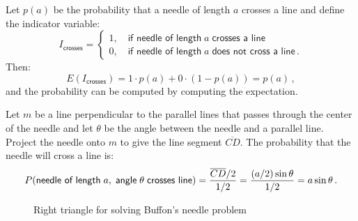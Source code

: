 
Let $p(a)$ be the probability that a needle of length $a$ crosses a line and define the indicator variable:
\[
I_{\textsf{crosses}}=
\left\{
\begin{array}{ll}
1,\quad \textsf{if needle of length}\;a\;\textsf{crosses a line}\\
0, \quad \textsf{if needle of length}\;a\;\textsf{does not cross a line}\,.
\end{array}
\right.
\]
Then:
\begin{equation}\label{eq.buffon-probability}
E(I_{\textsf{crosses}})=1\cdot p(a) + 0\cdot (1-p(a))=p(a)\,,
\end{equation}
and the probability can be computed by computing the expectation.

Let $m$ be a line perpendicular to the parallel lines that passes through the center of the needle and let $\theta$ be the angle between the needle and a parallel line. Project the needle onto $m$ to give the line segment $\overline{CD}$. The probability that the needle will cross a line is:
\begin{equation}\label{eq.cross}
P(\textsf{needle of length}\;a,\;\textsf{angle}\;\theta\;\textsf{crosses line})=\displaystyle\frac{\overline{CD}/2}{1/2}=\displaystyle\frac{(a/2)\sin \theta}{1/2}=a\sin\theta\,.
\end{equation}

\begin{figure}[bt]
\begin{center}
\end{center}
\caption{Right triangle for solving Buffon's needle problem}\label{f.buffon2}
\end{figure}


